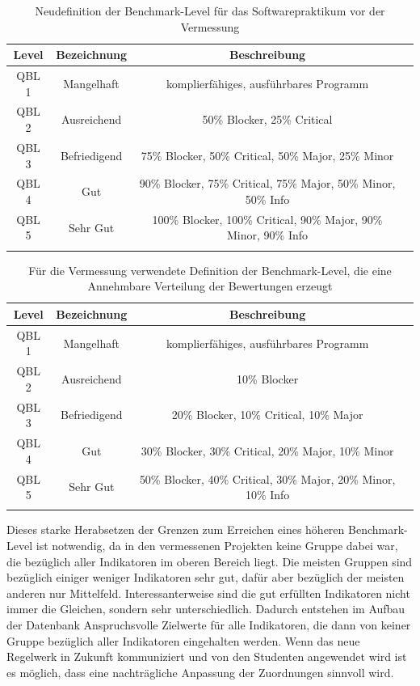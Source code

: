 \documentclass[da,ngerman]{stthesis}
\begin{document}
			\begin{center}
				\tabulinesep=1.5mm
				\begin{longtabu}{|c|c|c|c|}
					\hline
  					\textbf{Level} & \textbf{Bezeichnung} & \textbf{Beschreibung} \\
  					\hline 
					QBL 1 & Mangelhaft & komplierfähiges, ausführbares Programm \\  						\hline
  					QBL 2 & Ausreichend & 50\% Blocker, 25\% Critical \\ 
  					\hline
  					QBL 3 & Befriedigend & 75\% Blocker, 50\% Critical, 50\% Major, 25\% Minor \\
  					\hline
  					QBL 4 & Gut & 90\% Blocker, 75\% Critical, 75\% Major, 50\% Minor, 50\% Info \\
  					\hline
  					QBL 5 & Sehr Gut & 100\% Blocker, 100\% Critical, 90\% Major, 90\% Minor, 90\% Info \\
  					\hline
  					\caption{Neudefinition der Benchmark-Level für das Softwarepraktikum vor der Vermessung}
					\label{indexdef}
  				\end{longtabu}   
  			\end{center}
  			\begin{center}
				\tabulinesep=1.5mm
				\begin{longtabu}{|c|c|c|c|}
					\hline
  					\textbf{Level} & \textbf{Bezeichnung} & \textbf{Beschreibung} \\
  					\hline 
					QBL 1 & Mangelhaft & komplierfähiges, ausführbares Programm \\  						\hline
  					QBL 2 & Ausreichend & 10\% Blocker \\ 
  					\hline
  					QBL 3 & Befriedigend & 20\% Blocker, 10\% Critical, 10\% Major \\
  					\hline
  					QBL 4 & Gut & 30\% Blocker, 30\% Critical, 20\% Major, 10\% Minor \\
  					\hline
  					QBL 5 & Sehr Gut & 50\% Blocker, 40\% Critical, 30\% Major, 20\% Minor, 10\% Info \\
  					\hline
  					\caption{Für die Vermessung verwendete Definition der Benchmark-Level, die eine Annehmbare Verteilung der Bewertungen erzeugt}
					\label{indexdefnew}
  				\end{longtabu}   
  			\end{center}
  			Dieses starke Herabsetzen der Grenzen zum Erreichen eines höheren Benchmark-Level ist notwendig, da in den vermessenen Projekten keine Gruppe dabei war, die bezüglich aller Indikatoren im oberen Bereich liegt. Die meisten Gruppen sind bezüglich einiger weniger Indikatoren sehr gut, dafür aber bezüglich der meisten anderen nur Mittelfeld. Interessanterweise sind die gut erfüllten Indikatoren nicht immer die Gleichen, sondern sehr unterschiedlich. Dadurch entstehen im Aufbau der Datenbank Anspruchsvolle Zielwerte für alle Indikatoren, die dann von keiner Gruppe bezüglich aller Indikatoren eingehalten werden. Wenn das neue Regelwerk in Zukunft kommuniziert und von den Studenten angewendet wird ist es möglich, dass eine nachträgliche Anpassung der Zuordnungen sinnvoll wird. \newline
\end{document}

